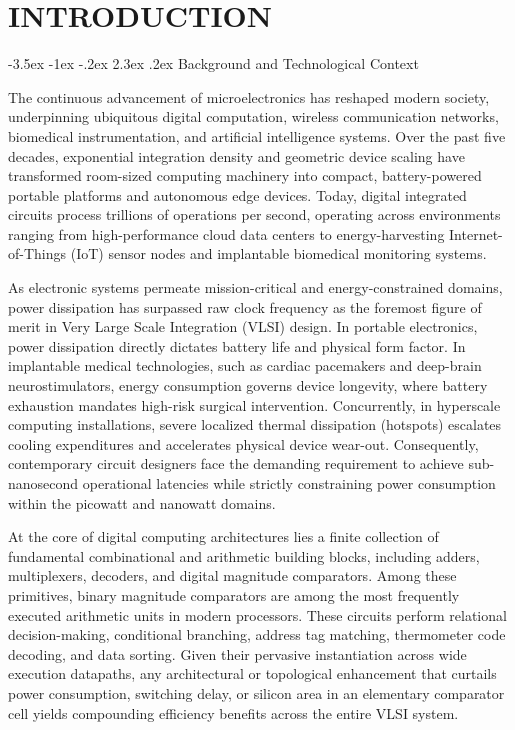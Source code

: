 \documentclass[12pt,a4paper,oneside]{report}
\makeatletter
\renewcommand\section{\@startsection {section}{1}{\z@}%
                                   {-3.5ex \@plus -1ex \@minus -.2ex}%
                                   {2.3ex \@plus.2ex}%
                                   {\normalfont\normalsize\bfseries}}
\makeatother
\begin{document}
\clearpage

\setcounter{page}{1}

\chapter{INTRODUCTION}

\section{Background and Technological Context}

The continuous advancement of microelectronics has reshaped modern society, underpinning ubiquitous digital computation, wireless communication networks, biomedical instrumentation, and artificial intelligence systems. Over the past five decades, exponential integration density and geometric device scaling have transformed room-sized computing machinery into compact, battery-powered portable platforms and autonomous edge devices. Today, digital integrated circuits process trillions of operations per second, operating across environments ranging from high-performance cloud data centers to energy-harvesting Internet-of-Things (IoT) sensor nodes and implantable biomedical monitoring systems.

As electronic systems permeate mission-critical and energy-constrained domains, power dissipation has surpassed raw clock frequency as the foremost figure of merit in Very Large Scale Integration (VLSI) design. In portable electronics, power dissipation directly dictates battery life and physical form factor. In implantable medical technologies, such as cardiac pacemakers and deep-brain neurostimulators, energy consumption governs device longevity, where battery exhaustion mandates high-risk surgical intervention. Concurrently, in hyperscale computing installations, severe localized thermal dissipation (hotspots) escalates cooling expenditures and accelerates physical device wear-out. Consequently, contemporary circuit designers face the demanding requirement to achieve sub-nanosecond operational latencies while strictly constraining power consumption within the picowatt and nanowatt domains.

At the core of digital computing architectures lies a finite collection of fundamental combinational and arithmetic building blocks, including adders, multiplexers, decoders, and digital magnitude comparators. Among these primitives, binary magnitude comparators are among the most frequently executed arithmetic units in modern processors. These circuits perform relational decision-making, conditional branching, address tag matching, thermometer code decoding, and data sorting. Given their pervasive instantiation across wide execution datapaths, any architectural or topological enhancement that curtails power consumption, switching delay, or silicon area in an elementary comparator cell yields compounding efficiency benefits across the entire VLSI system.
\end{document}
